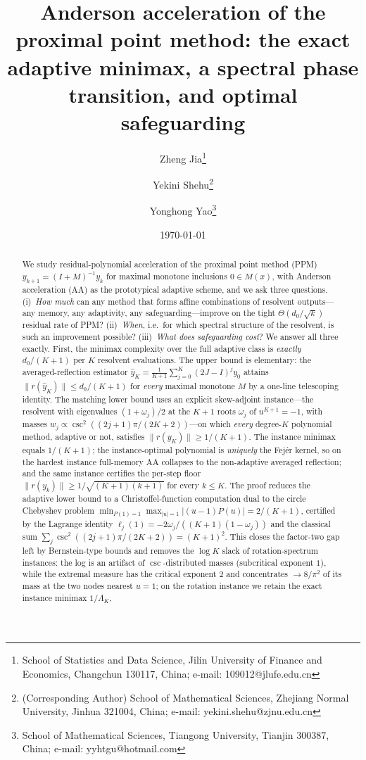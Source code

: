 \documentclass[11pt]{article}
\title{Anderson acceleration of the proximal point method: the exact adaptive minimax, a spectral phase transition, and optimal safeguarding}
\author{Zheng Jia\footnote{School of Statistics and Data Science,
Jilin University of Finance and Economics, Changchun 130117, China;
e-mail: 109012@jlufe.edu.cn}
\and Yekini Shehu\footnote{(Corresponding Author) School of Mathematical Sciences,
Zhejiang Normal University, Jinhua 321004, China;
e-mail: yekini.shehu@zjnu.edu.cn}
\and Yonghong Yao\footnote{School of Mathematical Sciences,
Tiangong University, Tianjin 300387, China;
e-mail: yyhtgu@hotmail.com}}
\date{\today}
\theoremstyle{definition}
\theoremstyle{remark}
\newcommand{\norm}[1]{\| #1 \|}
\newcommand{\abs}[1]{| #1 |}
\begin{document}
\maketitle

\begin{abstract}
\noindent
We study residual-polynomial acceleration of the proximal point method (PPM)
$y_{k+1}=(I+M)^{-1}y_k$ for maximal monotone inclusions $0\in M(x)$, with
Anderson acceleration (AA) as the prototypical adaptive scheme, and we ask
three questions. (i)~\emph{How much} can any method that forms affine
combinations of resolvent outputs---any memory, any adaptivity, any
safeguarding---improve on the tight $\Theta(d_0/\sqrt{k})$ residual rate of
PPM? (ii)~\emph{When}, i.e.\ for which spectral structure of the resolvent,
is such an improvement possible? (iii)~\emph{What does safeguarding cost}?
We answer all three exactly. First, the minimax complexity over the full
adaptive class is \emph{exactly} $d_0/(K+1)$ per $K$ resolvent evaluations.
The upper bound is elementary: the averaged-reflection estimator
$\hat y_K=\frac1{K+1}\sum_{j=0}^{K}(2J-I)^jy_0$ attains
$\norm{r(\hat y_K)}\le d_0/(K+1)$ for \emph{every} maximal monotone $M$ by a
one-line telescoping identity. The matching lower bound uses an explicit
skew-adjoint instance---the resolvent with eigenvalues $(1+\omega_j)/2$ at
the $K+1$ roots $\omega_j$ of $u^{K+1}=-1$, with masses
$w_j\propto\csc^2((2j+1)\pi/(2K+2))$---on which \emph{every} degree-$K$
polynomial method, adaptive or not, satisfies
$\norm{r(y_K)}\ge 1/(K+1)$. The instance minimax equals $1/(K+1)$; the
instance-optimal polynomial is \emph{uniquely} the Fej\'er kernel, so on
the hardest instance full-memory AA collapses to the non-adaptive averaged
reflection; and the same instance certifies the per-step floor
$\norm{r(y_k)}\ge1/\sqrt{(K+1)(k+1)}$ for every $k\le K$. The proof reduces
the adaptive lower bound to a Christoffel-function computation dual to the
circle Chebyshev problem
$\min_{P(1)=1}\max_{\abs u=1}\abs{(u-1)P(u)}=2/(K+1)$, certified by the
Lagrange identity $\ell_j(1)=-2\omega_j/((K+1)(1-\omega_j))$ and the
classical sum $\sum_j\csc^2((2j+1)\pi/(2K+2))=(K+1)^2$. This closes the
factor-two gap left by Bernstein-type bounds and removes the $\log K$
slack of rotation-spectrum instances: the log is an artifact of
$\csc$-distributed masses (subcritical exponent $1$), while the extremal
measure has the critical exponent $2$ and concentrates $\to 8/\pi^2$ of
its mass at the two nodes nearest $u=1$; on the rotation instance we
retain the exact instance minimax $1/\Lambda_K$,

\end{abstract}
\end{document}
